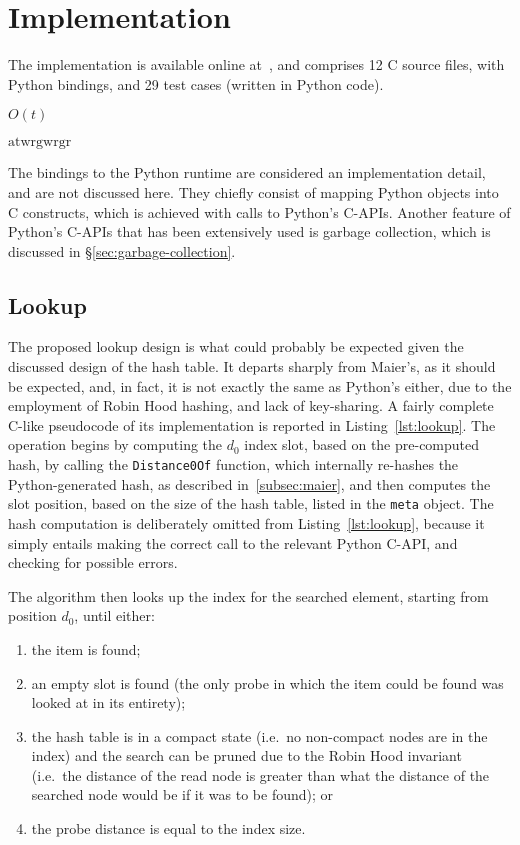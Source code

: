 \chapter{Implementation}\label{ch:implementation}

The implementation is available online at~\cite[src/cereggii/atomic\_dict]{cereggii}, and comprises 12 C source files, with Python bindings, and 29 test cases (written in Python code).

\cite{peniocereus-greggii}

$O(t)$

$\textrm{atw} \textrm{rgw} \textrm{rgr}$

The bindings to the Python runtime are considered an implementation detail, and are not discussed here.
They chiefly consist of mapping Python objects into C constructs, which is achieved with calls to Python's C-APIs.
Another feature of Python's C-APIs that has been extensively used is garbage collection, which is discussed in \S\ref{sec:garbage-collection}.


\section{Lookup}\label{sec:lookup}

The proposed lookup design is what could probably be expected given the discussed design of the hash table.
It departs sharply from Maier's, as it should be expected, and, in fact, it is not exactly the same as Python's either, due to the employment of Robin Hood hashing, and lack of key-sharing.
A fairly complete C-like pseudocode of its implementation is reported in Listing~\ref{lst:lookup}.
The operation begins by computing the $d_0$ index slot, based on the pre-computed hash, by calling the \texttt{Distance0Of} function, which internally re-hashes the Python-generated hash, as described in~\ref{subsec:maier}, and then computes the slot position, based on the size of the hash table, listed in the \texttt{meta} object.
The hash computation is deliberately omitted from Listing~\ref{lst:lookup}, because it simply entails making the correct call to the relevant Python C-API, and checking for possible errors.

The algorithm then looks up the index for the searched element, starting from position $d_0$, until either:
\begin{enumerate}
    \item the item is found;
    \item an empty slot is found (the only probe in which the item could be found was looked at in its entirety);
    \item the hash table is in a compact state (i.e.\ no non-compact nodes are in the index) and the search can be pruned due to the Robin Hood invariant (i.e.\ the distance of the read node is greater than what the distance of the searched node would be if it was to be found); or
    \item the probe distance is equal to the index size.
\end{enumerate}

